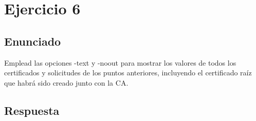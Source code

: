 \documentclass[10pt,a4paper,spanish]{report}
\begin{document}
\chapter{Ejercicio 6}

\section{Enunciado}
\noindent
Emplead las opciones -text y -noout para mostrar los valores de todos los certificados y solicitudes de los puntos anteriores, incluyendo el certificado raíz que habrá sido creado junto con la CA.

\section{Respuesta}
\noindent

\end{document}

